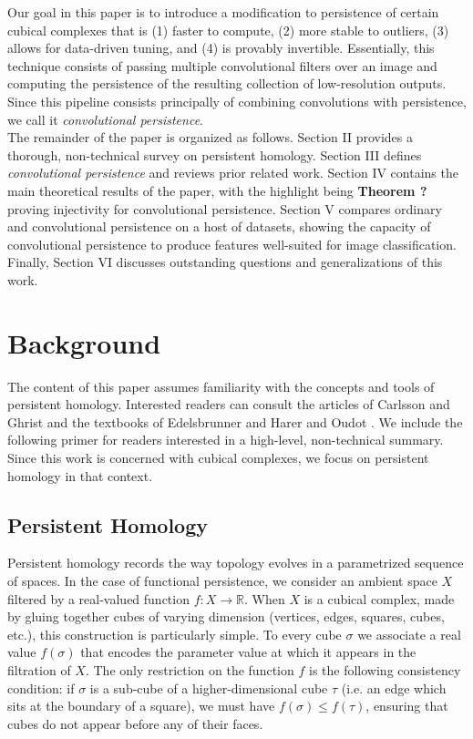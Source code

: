 \documentclass[conference]{IEEEtran}
\theoremstyle{definition}
\numberwithin{figure}{section}
\begin{document}
Our goal in this paper is to introduce a modification to persistence of certain cubical complexes that is (1) faster to compute, (2) more stable to outliers, (3) allows for data-driven tuning, and (4) is provably invertible. Essentially, this technique consists of passing multiple convolutional filters over an image and computing the persistence of the resulting collection of low-resolution outputs. Since this pipeline consists principally of combining convolutions with persistence, we call it \emph{convolutional persistence}.\\

The remainder of the paper is organized as follows. Section II provides a thorough, non-technical survey on persistent homology. Section III defines \emph{convolutional persistence} and reviews prior related work. Section IV contains the main theoretical results of the paper, with the highlight being {\bf Theorem ?} proving injectivity for convolutional persistence. Section V compares ordinary and convolutional persistence on a host of datasets, showing the capacity of convolutional persistence to produce features well-suited for image classification. Finally, Section VI discusses outstanding questions and generalizations of this work.

\section{Background}
\label{sec:background}
The content of this paper assumes familiarity with the concepts and tools of persistent homology. Interested readers can consult the articles of Carlsson \cite{carlsson2009topology} and Ghrist \cite{ghrist2008barcodes} and the textbooks of 
Edelsbrunner and Harer \cite{edelsbrunner2010computational} and Oudot \cite{oudot2015persistence}. We include the following primer for readers interested in a high-level, non-technical summary. Since this work is concerned with cubical complexes, we focus on persistent homology in that context. 

\subsection{Persistent Homology}

Persistent homology records the way topology evolves in a parametrized sequence of spaces. In the case of functional persistence, we consider an ambient space $X$ filtered by a real-valued function $f:X \to \mathbb{R}$. When $X$ is a cubical complex, made by gluing together cubes of varying dimension (vertices, edges, squares, cubes, etc.), this construction is particularly simple. To every cube $\sigma$ we associate a real value $f(\sigma)$ that encodes the parameter value at which it appears in the filtration of $X$. The only restriction on the function $f$ is the following consistency condition: if $\sigma$ is a sub-cube of a higher-dimensional cube $\tau$ (i.e. an edge which sits at the boundary of a square), we must have $f(\sigma) \leq f(\tau)$, ensuring that cubes do not appear before any of their faces.\\
\end{document}
